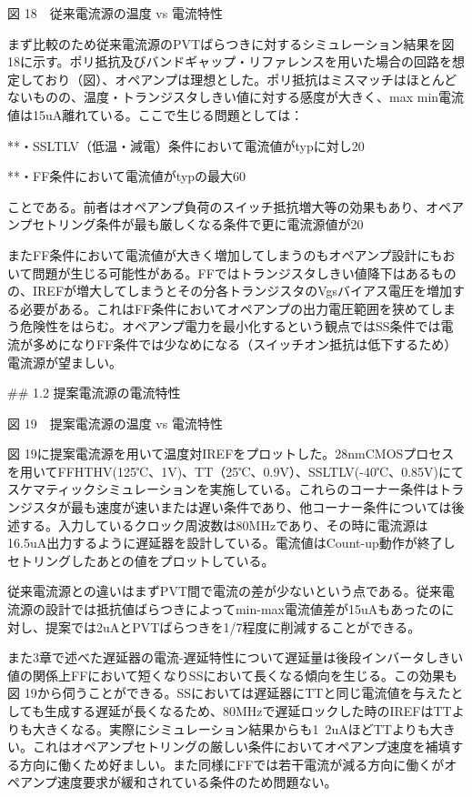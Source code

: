 \documentclass[letterpaper, 10 pt, conference]{ieeeconf}  %
\begin{document}
図 18　従来電流源の温度 vs 電流特性

まず比較のため従来電流源のPVTばらつきに対するシミュレーション結果を図 18に示す。ポリ抵抗及びバンドギャップ・リファレンスを用いた場合の回路を想定しており（図）、オペアンプは理想とした。ポリ抵抗はミスマッチはほとんどないものの、温度・トランジスタしきい値に対する感度が大きく、max min電流値は15uA離れている。ここで生じる問題としては：

**・SSLTLV（低温・減電）条件において電流値がtypに対し20%

**・FF条件において電流値がtypの最大60%

ことである。前者はオペアンプ負荷のスイッチ抵抗増大等の効果もあり、オペアンプセトリング条件が最も厳しくなる条件で更に電流源値が20%

またFF条件において電流値が大きく増加してしまうのもオペアンプ設計にもおいて問題が生じる可能性がある。FFではトランジスタしきい値降下はあるものの、IREFが増大してしまうとその分各トランジスタのVgsバイアス電圧を増加する必要がある。これはFF条件においてオペアンプの出力電圧範囲を狭めてしまう危険性をはらむ。オペアンプ電力を最小化するという観点ではSS条件では電流が多めになりFF条件では少なめになる（スイッチオン抵抗は低下するため）電流源が望ましい。

## 1.2 提案電流源の電流特性

図 19　提案電流源の温度 vs 電流特性

図 19に提案電流源を用いて温度対IREFをプロットした。28nmCMOSプロセスを用いてFFHTHV(125℃、1V)、TT（25℃、0.9V）、SSLTLV(-40℃、0.85V)にてスケマティックシミュレーションを実施している。これらのコーナー条件はトランジスタが最も速度が速いまたは遅い条件であり、他コーナー条件については後述する。入力しているクロック周波数は80MHzであり、その時に電流源は16.5uA出力するように遅延器を設計している。電流値はCount-up動作が終了しセトリングしたあとの値をプロットしている。

従来電流源との違いはまずPVT間で電流の差が少ないという点である。従来電流源の設計では抵抗値ばらつきによってmin-max電流値差が15uAもあったのに対し、提案では2uAとPVTばらつきを1/7程度に削減することができる。

また3章で述べた遅延器の電流-遅延特性について遅延量は後段インバータしきい値の関係上FFにおいて短くなりSSにおいて長くなる傾向を生じる。この効果も図 19から伺うことができる。SSにおいては遅延器にTTと同じ電流値を与えたとしても生成する遅延が長くなるため、80MHzで遅延ロックした時のIREFはTTよりも大きくなる。実際にシミュレーション結果からも1~2uAほどTTよりも大きい。これはオペアンプセトリングの厳しい条件においてオペアンプ速度を補填する方向に働くため好ましい。また同様にFFでは若干電流が減る方向に働くがオペアンプ速度要求が緩和されている条件のため問題ない。
\end{document}
